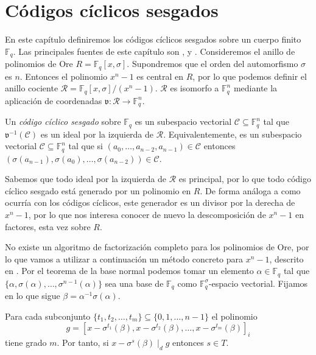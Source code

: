 \chapter{Códigos cíclicos sesgados}

En este capítulo definiremos los códigos cíclicos sesgados sobre un cuerpo finito \(\mathbb F_q\).
Las principales fuentes de este capítulo son \parencite{gomez-torrecillas_new_2016}, \parencite{gomez-torrecillas_petersongorensteinzierler_2018} y \parencite{shi_codes_2017}.
Consideremos el anillo de polinomios de Ore \(R = \mathbb F_q[x, \sigma]\).
Supondremos que el orden del automorfismo \(\sigma\) es \(n\).
Entonces el polinomio \(x^n - 1\) es central en \(R\), por lo que podemos definir el anillo cociente \(\mathcal R = \mathbb F_q[x, \sigma]/(x^n - 1)\).
\(\mathcal R\) es isomorfo a \(\mathbb F_q^n\) mediante la aplicación de coordenadas \(\mathfrak v : \mathcal R \to \mathbb F_q^n\).

\begin{definition}
  Un \emph{código cíclico sesgado} sobre \(\mathbb F_q\) es un subespacio vectorial \(\mathcal C \subseteq \mathbb F_q^n\) tal que \(\mathfrak v^{-1}(\mathcal C)\) es un ideal por la izquierda de \(\mathcal R\).
  Equivalentemente, es un subespacio vectorial \(\mathcal C \subseteq \mathbb F_q^n\) tal que si \((a_0, \dots, a_{n-2}, a_{n-1}) \in \mathcal C\) entonces \((\sigma(a_{n-1}), \sigma(a_0), \dots, \sigma(a_{n-2})) \in \mathcal C\).
\end{definition}


Sabemos que todo ideal por la izquierda de \(\mathcal R\) es principal, por lo que todo código cíclico sesgado está generado por un polinomio en \(R\).
De forma análoga a como ocurría con los códigos cíclicos, este generador es un divisor por la derecha de \(x^n - 1\), por lo que nos interesa conocer de nuevo la descomposición de \(x^n - 1\) en factores, esta vez sobre \(R\).

No existe un algoritmo de factorización completo para los polinomios de Ore, por lo que vamos a utilizar a continuación un método concreto para \(x^n - 1\), descrito en \parencite{gomez-torrecillas_new_2016}.
Por el teorema de la base normal podemos tomar un elemento \(\alpha \in \mathbb F_q\) tal que \(\{\alpha, \sigma(\alpha), \dots, \sigma^{n-1}(\alpha)\}\) sea una base de  \(\mathbb F_q\) como \(\mathbb F_q^{\sigma}\)-espacio vectorial.
Fijamos en lo que sigue \(\beta = \alpha^{-1}\sigma(\alpha)\).

\begin{lemma}
  \label{lem:pol-t-beta}
  Para cada subconjunto \(\{t_1, t_2, \dots, t_m\} \subseteq \{0, 1, \dots, n - 1\}\) el polinomio 
  \[
    g = \left[x - \sigma^{t_1}(\beta), x - \sigma^{t_{2}}(\beta), \dots, x - \sigma^{t_m}(\beta)\right]_{i}
  \]
  tiene grado \(m\).
  Por tanto, si \(x - \sigma^s(\beta) \mid_d g\) entonces \(s \in T\).
\end{lemma}


